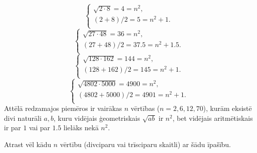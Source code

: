 \documentclass[a4paper,12pt]{article}
\newcommand\answer[1]{}
\begin{document}
\vspace{10pt}
\begin{problem}
\[ \left\{ \begin{array}{l}
\sqrt{2 \cdot 8} = 4 = n^2,\\
(2 + 8)/2 = 5 = n^2+1.\\
\end{array} \right. \]
\[ \left\{ \begin{array}{l}
\sqrt{27 \cdot 48} = 36 = n^2,\\
(27 + 48)/2 = 37.5 = n^2+1.5.\\
\end{array} \right. \]
\[ \left\{ \begin{array}{l}
\sqrt{128 \cdot 162} = 144 = n^2,\\
(128 + 162)/2 = 145 = n^2+1.\\
\end{array} \right. \]
\[ \left\{ \begin{array}{l}
\sqrt{4802 \cdot 5000} = 4900 = n^2,\\
(4802 + 5000)/2 = 4901 = n^2+1.\\
\end{array} \right. \]
Attēlā redzamajos piemēros ir vairākas $n$ vērtības ($n = 2,6,12,70$), 
kurām eksistē divi naturāli $a,b$, kuru vidējais ģeometriskais $\sqrt{ab}$
ir $n^2$, bet vidējais aritmētiskais ir par $1$ vai par $1.5$
lielāks nekā $n^2$. 

Atrast vēl kādu $n$ vērtību (divciparu vai trīsciparu skaitli) ar 
šādu īpašību. 
\answer{

{\bf Atbilde.} $\mathtt{84}$ vai $\mathtt{408}$. 

Var pārbaudīt vienādības: 
\[ \left\{ \begin{array}{l}
\sqrt{6912 \cdot 7203} = 7056 = 84^2,\\
(6912 + 7203)/2 = 7057.5 = 84^2+1.5.\\
\end{array} \right. \]
Kā arī 
\[ \left\{ \begin{array}{l}
\sqrt{165888 \cdot 167042} = 166464 = 408^2,\\
(165888 + 167042)/2 = 166465 = 408^2+1.\\
\end{array} \right. \]
Tās vērtības $n$, kurām $\sqrt{ab} = n^2$ un $(a+b)/2 = n^2 + 1$ apmierina
Pella vienādojumu $2n^2 + 1 = m^2$ (kaut kādam veselam $m$). 
Pella vienādojums izskaidro, kāpēc attālumi starp atrisinājumiem strauji pieaug.
}
\end{problem}
\end{document}
